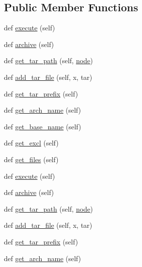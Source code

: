 \subsection*{Public Member Functions}
\begin{DoxyCompactItemize}
\item 
def \hyperlink{classwaflib_1_1_scripting_1_1_dist_a1ed5e146ed66af4d02c205dbb428f49f}{execute} (self)
\item 
def \hyperlink{classwaflib_1_1_scripting_1_1_dist_aaaa979f347096bd91a2feb553bbacf35}{archive} (self)
\item 
def \hyperlink{classwaflib_1_1_scripting_1_1_dist_a64707e5623688ede0aa955afe3640b98}{get\+\_\+tar\+\_\+path} (self, \hyperlink{structnode}{node})
\item 
def \hyperlink{classwaflib_1_1_scripting_1_1_dist_a2afba826ee8f5b522e6ce822f9878755}{add\+\_\+tar\+\_\+file} (self, x, tar)
\item 
def \hyperlink{classwaflib_1_1_scripting_1_1_dist_a20b28677d28b516c05e8af1b20c65c67}{get\+\_\+tar\+\_\+prefix} (self)
\item 
def \hyperlink{classwaflib_1_1_scripting_1_1_dist_a98d05f8f6a2fc8f33814fbc654135724}{get\+\_\+arch\+\_\+name} (self)
\item 
def \hyperlink{classwaflib_1_1_scripting_1_1_dist_aba6bf457f948f8ac80d1de9f47a59ac2}{get\+\_\+base\+\_\+name} (self)
\item 
def \hyperlink{classwaflib_1_1_scripting_1_1_dist_a1280a2469cad7d9fa88c3afcbbfa920d}{get\+\_\+excl} (self)
\item 
def \hyperlink{classwaflib_1_1_scripting_1_1_dist_afe6d98e6e39822f250f9302b07c0afab}{get\+\_\+files} (self)
\item 
def \hyperlink{classwaflib_1_1_scripting_1_1_dist_a1ed5e146ed66af4d02c205dbb428f49f}{execute} (self)
\item 
def \hyperlink{classwaflib_1_1_scripting_1_1_dist_aaaa979f347096bd91a2feb553bbacf35}{archive} (self)
\item 
def \hyperlink{classwaflib_1_1_scripting_1_1_dist_a64707e5623688ede0aa955afe3640b98}{get\+\_\+tar\+\_\+path} (self, \hyperlink{structnode}{node})
\item 
def \hyperlink{classwaflib_1_1_scripting_1_1_dist_a2afba826ee8f5b522e6ce822f9878755}{add\+\_\+tar\+\_\+file} (self, x, tar)
\item 
def \hyperlink{classwaflib_1_1_scripting_1_1_dist_a20b28677d28b516c05e8af1b20c65c67}{get\+\_\+tar\+\_\+prefix} (self)
\item 
def \hyperlink{classwaflib_1_1_scripting_1_1_dist_a98d05f8f6a2fc8f33814fbc654135724}{get\+\_\+arch\+\_\+name} (self)

\end{DoxyCompactItemize}

